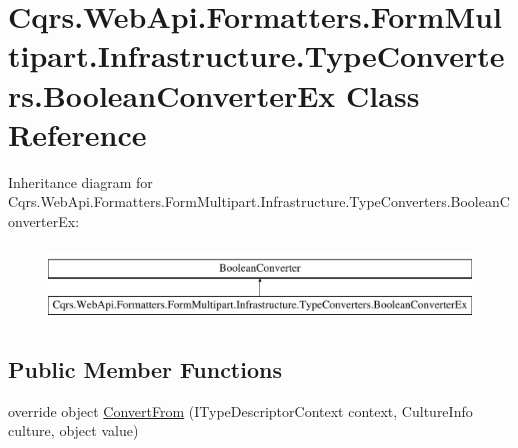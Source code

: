 \hypertarget{classCqrs_1_1WebApi_1_1Formatters_1_1FormMultipart_1_1Infrastructure_1_1TypeConverters_1_1BooleanConverterEx}{}\section{Cqrs.\+Web\+Api.\+Formatters.\+Form\+Multipart.\+Infrastructure.\+Type\+Converters.\+Boolean\+Converter\+Ex Class Reference}
\label{classCqrs_1_1WebApi_1_1Formatters_1_1FormMultipart_1_1Infrastructure_1_1TypeConverters_1_1BooleanConverterEx}
Inheritance diagram for Cqrs.\+Web\+Api.\+Formatters.\+Form\+Multipart.\+Infrastructure.\+Type\+Converters.\+Boolean\+Converter\+Ex\+:\begin{figure}[H]
\begin{center}
\leavevmode
\includegraphics[height=2.000000cm]{classCqrs_1_1WebApi_1_1Formatters_1_1FormMultipart_1_1Infrastructure_1_1TypeConverters_1_1BooleanConverterEx}
\end{center}
\end{figure}
\subsection*{Public Member Functions}
\begin{DoxyCompactItemize}
\item 
override object \hyperlink{classCqrs_1_1WebApi_1_1Formatters_1_1FormMultipart_1_1Infrastructure_1_1TypeConverters_1_1BooleanConverterEx_afac51ee1e191c7b27da72d7cf6f25fa7_afac51ee1e191c7b27da72d7cf6f25fa7}{Convert\+From} (I\+Type\+Descriptor\+Context context, Culture\+Info culture, object value)
\end{DoxyCompactItemize}


